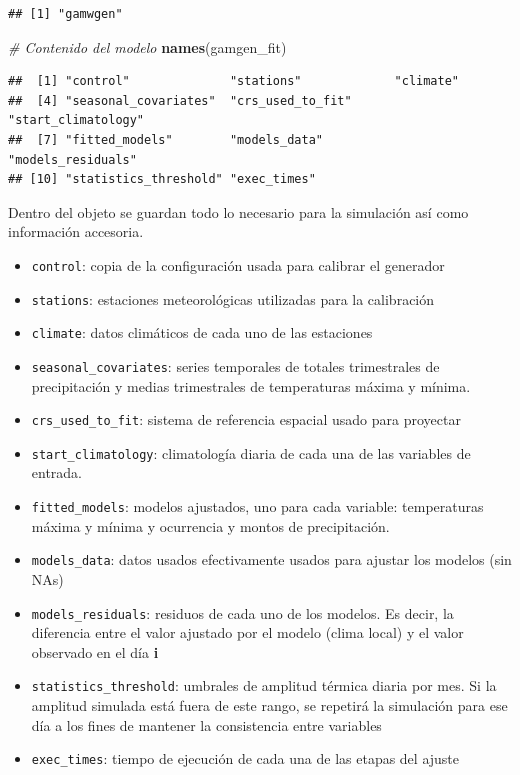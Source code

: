 \documentclass[
  12pt]{article}
\newenvironment{Shaded}{}{}
\newcommand{\CommentTok}[1]{\textcolor[rgb]{0.38,0.63,0.69}{\textit{#1}}}
\newcommand{\KeywordTok}[1]{\textcolor[rgb]{0.00,0.44,0.13}{\textbf{#1}}}
\newcommand{\NormalTok}[1]{#1}
\providecommand{\tightlist}{%
  \setlength{\itemsep}{0pt}\setlength{\parskip}{0pt}}
\begin{document}
\begin{verbatim}
## [1] "gamwgen"
\end{verbatim}

\begin{Shaded}
\begin{Highlighting}[]
\CommentTok{# Contenido del modelo }
\KeywordTok{names}\NormalTok{(gamgen_fit)}
\end{Highlighting}
\end{Shaded}

\begin{verbatim}
##  [1] "control"              "stations"             "climate"             
##  [4] "seasonal_covariates"  "crs_used_to_fit"      "start_climatology"   
##  [7] "fitted_models"        "models_data"          "models_residuals"    
## [10] "statistics_threshold" "exec_times"
\end{verbatim}

Dentro del objeto se guardan todo lo necesario para la simulación así como información accesoria.

\begin{itemize}
\tightlist
\item
  \texttt{control}: copia de la configuración usada para calibrar el generador
\item
  \texttt{stations}: estaciones meteorológicas utilizadas para la calibración
\item
  \texttt{climate}: datos climáticos de cada uno de las estaciones
\item
  \texttt{seasonal\_covariates}: series temporales de totales trimestrales de precipitación y medias trimestrales de temperaturas máxima y mínima.
\item
  \texttt{crs\_used\_to\_fit}: sistema de referencia espacial usado para proyectar
\item
  \texttt{start\_climatology}: climatología diaria de cada una de las variables de entrada.
\item
  \texttt{fitted\_models}: modelos ajustados, uno para cada variable: temperaturas máxima y mínima y ocurrencia y montos de precipitación.
\item
  \texttt{models\_data}: datos usados efectivamente usados para ajustar los modelos (sin NAs)
\item
  \texttt{models\_residuals}: residuos de cada uno de los modelos. Es decir, la diferencia entre el valor ajustado por el modelo (clima local) y el valor observado en el día \textbf{i}
\item
  \texttt{statistics\_threshold}: umbrales de amplitud térmica diaria por mes. Si la amplitud simulada está fuera de este rango, se repetirá la simulación para ese día a los fines de mantener la consistencia entre variables
\item
  \texttt{exec\_times}: tiempo de ejecución de cada una de las etapas del ajuste
\end{itemize}
\end{document}
